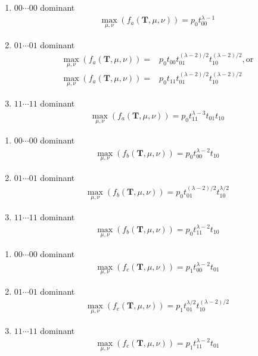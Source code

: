 ﻿\documentclass[a4paper,xelatex,english]{bxjsarticle}
\newcommand\mib[1]{\boldsymbol{#1}}
\begin{document}
\begin{enumerate}[{a)}-i)]
	\item $00 \cdots 00$ dominant 
	\begin{align}
	\max_{\mu, \nu}(f_{a}(\mib{T}, \mu, \nu)) = p_{0} t_{00}^{\lambda - 1}
	\end{align}
	\item $01 \cdots 01$ dominant 
	\begin{align}
	\max_{\mu, \nu}(f_{a}(\mib{T}, \mu, \nu)) = & p_{0} t_{00} t_{01}^{(\lambda - 2) / 2} t_{10}^{(\lambda - 2) / 2}, {\textrm{or}} \\
	\max_{\mu, \nu}(f_{a}(\mib{T}, \mu, \nu)) = & p_{0} t_{11} t_{01}^{(\lambda - 2) / 2} t_{10}^{(\lambda - 2) / 2}
	\end{align}
	\item $11 \cdots 11$ dominant 
	\begin{align}
	\max_{\mu, \nu}(f_{a}(\mib{T}, \mu, \nu)) = p_{0} t_{11}^{\lambda - 3} t_{01} t_{10} \label{expression:neg1}
	\end{align}
\end{enumerate}

\begin{enumerate}[{b)}-i)]
	\item $00 \cdots 00$ dominant 
	\begin{align}
	\max_{\mu, \nu}(f_{b}(\mib{T}, \mu, \nu)) = p_{0} t_{00}^{\lambda - 2} t_{10}
	 \label{expression:nonneg1}
	\end{align}
	\item $01 \cdots 01$ dominant 
	\begin{align}
	\max_{\mu, \nu}(f_{b}(\mib{T}, \mu, \nu)) = p_{0} t_{01}^{(\lambda - 2) / 2} t_{10}^{\lambda / 2}
	\end{align}
	\item $11 \cdots 11$ dominant 
	\begin{align}
	\max_{\mu, \nu}(f_{b}(\mib{T}, \mu, \nu)) = p_{0} t_{11}^{\lambda - 2} t_{10} \label{expression:neg2}
	\end{align}
\end{enumerate}

\begin{enumerate}[{c)}-i)]
	\item $00 \cdots 00$ dominant 
	\begin{align}
	\max_{\mu, \nu}(f_{c}(\mib{T}, \mu, \nu)) = p_{1} t_{00}^{\lambda - 2} t_{01} \label{expression:neg3}
	\end{align}
	\item $01 \cdots 01$ dominant 
	\begin{align}
	\max_{\mu, \nu}(f_{c}(\mib{T}, \mu, \nu)) = p_{1} t_{01}^{\lambda / 2} t_{10}^{(\lambda - 2) / 2}
	\end{align}
	\item $11 \cdots 11$ dominant 
	\begin{align}
	\max_{\mu, \nu}(f_{c}(\mib{T}, \mu, \nu)) = p_{1} t_{11}^{\lambda - 2} t_{01}
	\end{align}
\end{enumerate}
\end{document}
